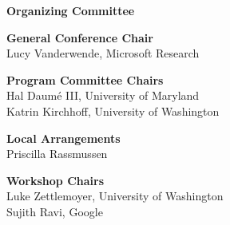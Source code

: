 






%

 {\Large \bf Organizing Committee}

\vspace*{0.5cm}


{\bf General Conference Chair}\vspace{2mm} \\
Lucy Vanderwende, Microsoft Research

\vspace{3mm}
{\bf Program Committee Chairs}\vspace{2mm} \\
Hal Daumé III, University of Maryland \\
Katrin Kirchhoff, University of Washington

\vspace{3mm}
{\bf Local Arrangements}\vspace{2mm} \\
Priscilla Rassmussen

\vspace{3mm}
{\bf Workshop Chairs}\vspace{2mm} \\
Luke Zettlemoyer, University of Washington \\
Sujith Ravi, Google

